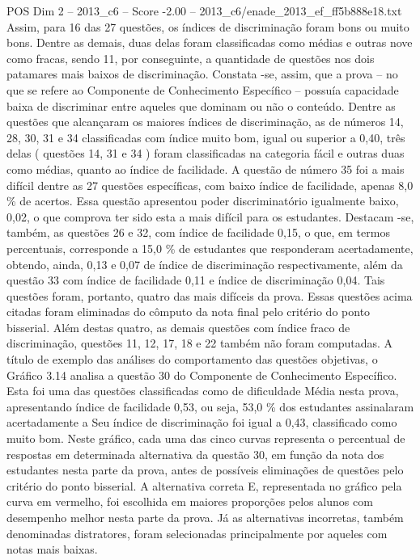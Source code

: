 \begin{textsample}{POS Dim 2 – 2013\_c6 – Score -2.00 – 2013\_c6/enade\_2013\_ef\_ff5b888e18.txt}
Assim, para 16 das 27 questões, os índices de discriminação foram bons ou muito bons.
Dentre as demais, duas delas foram classificadas como médias e outras nove como fracas, sendo 11, por conseguinte, a quantidade de questões nos dois patamares mais baixos de discriminação.
Constata -se, assim, que a prova – no que se refere ao Componente de Conhecimento Específico – possuía capacidade baixa de discriminar entre aqueles que dominam ou não o conteúdo.
Dentre as questões que alcançaram os maiores índices de discriminação, as de números 14, 28, 30, 31 e 34 classificadas com índice muito bom, igual ou superior a 0,40, três delas ( questões 14, 31 e 34 ) foram classificadas na categoria fácil e outras duas como médias, quanto ao índice de facilidade.
A questão de número 35 foi a mais difícil dentre as 27 questões específicas, com baixo índice de facilidade, apenas 8,0 \% de acertos.
Essa questão apresentou poder discriminatório igualmente baixo, 0,02, o que comprova ter sido esta a mais difícil para os estudantes.
Destacam -se, também, as questões 26 e 32, com índice de facilidade 0,15, o que, em termos percentuais, corresponde a 15,0 \% de estudantes que responderam acertadamente, obtendo, ainda, 0,13 e 0,07 de índice de discriminação respectivamente, além da questão 33 com índice de facilidade 0,11 e índice de discriminação 0,04.
Tais questões foram, portanto, quatro das mais difíceis da prova.
Essas questões acima citadas foram eliminadas do cômputo da nota final pelo critério do ponto bisserial.
Além destas quatro, as demais questões com índice fraco de discriminação, questões 11, 12, 17, 18 e 22 também não foram computadas.
A título de exemplo das análises do comportamento das questões objetivas, o Gráfico 3.14 analisa a questão 30 do Componente de Conhecimento Específico.
Esta foi uma das questões classificadas como de dificuldade Média nesta prova, apresentando índice de facilidade 0,53, ou seja, 53,0 \% dos estudantes assinalaram acertadamente a Seu índice de discriminação foi igual a 0,43, classificado como muito bom.
Neste gráfico, cada uma das cinco curvas representa o percentual de respostas em determinada alternativa da questão 30, em função da nota dos estudantes nesta parte da prova, antes de possíveis eliminações de questões pelo critério do ponto bisserial.
A alternativa correta E, representada no gráfico pela curva em vermelho, foi escolhida em maiores proporções pelos alunos com desempenho melhor nesta parte da prova.
Já as alternativas incorretas, também denominadas distratores, foram selecionadas principalmente por aqueles com notas mais baixas.

\end{textsample}
